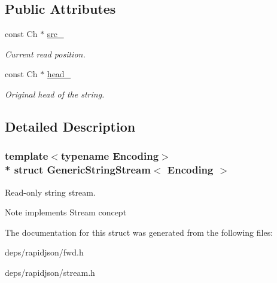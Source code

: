 \subsection*{Public Attributes}
\begin{DoxyCompactItemize}
\item 
const Ch $\ast$ \hyperlink{struct_generic_string_stream_aaf19f27a981d73b6edd506f182b27f6c}{src\+\_\+}\hypertarget{struct_generic_string_stream_aaf19f27a981d73b6edd506f182b27f6c}{}\label{struct_generic_string_stream_aaf19f27a981d73b6edd506f182b27f6c}

\begin{DoxyCompactList}\small\item\em Current read position. \end{DoxyCompactList}\item 
const Ch $\ast$ \hyperlink{struct_generic_string_stream_a39a3423495f959a7ca2f6e140e5fcbe3}{head\+\_\+}\hypertarget{struct_generic_string_stream_a39a3423495f959a7ca2f6e140e5fcbe3}{}\label{struct_generic_string_stream_a39a3423495f959a7ca2f6e140e5fcbe3}

\begin{DoxyCompactList}\small\item\em Original head of the string. \end{DoxyCompactList}\end{DoxyCompactItemize}


\subsection{Detailed Description}
\subsubsection*{template$<$typename Encoding$>$\\*
struct Generic\+String\+Stream$<$ Encoding $>$}

Read-\/only string stream. 

\begin{DoxyNote}{Note}
implements Stream concept 
\end{DoxyNote}


The documentation for this struct was generated from the following files\+:\begin{DoxyCompactItemize}
\item 
deps/rapidjson/fwd.\+h\item 
deps/rapidjson/stream.\+h\end{DoxyCompactItemize}
